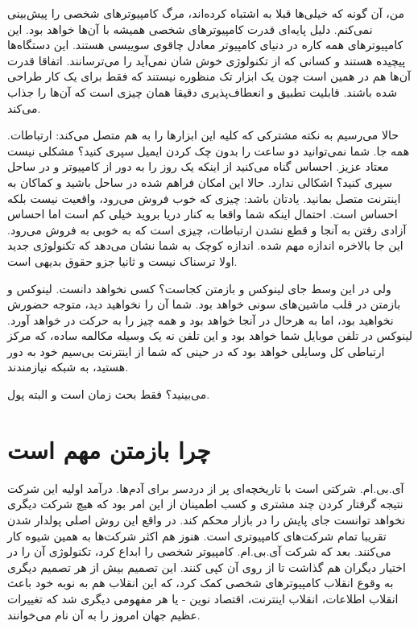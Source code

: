 من، آن گونه که خیلی‌ها قبلا به اشتباه کرده‌اند، مرگ کامپیوترهای شخصی را
پیش‌بینی نمی‌کنم. دلیل پایه‌ای قدرت کامپیوترهای شخصی همیشه با آن‌ها خواهد
بود. این کامپیوترهای همه کاره در دنیای کامپیوتر معادل چاقوی سوییسی
هستند. این دستگاه‌ها پیچیده هستند و کسانی که از تکنولوژی خوش شان نمی‌آید
را می‌ترسانند. اتفاقا قدرت آن‌ها هم در همین است چون یک ابزار تک منظوره
نیستند که فقط برای یک کار طراحی شده باشند. قابلیت تطبیق و انعطاف‌پذیری
دقیقا همان‌ چیزی است که آن‌ها را جذاب می‌کند.

حالا می‌رسیم به نکته‌ مشترکی که کلیه این ابزارها را به هم متصل می‌کند:
ارتباطات. همه جا. شما نمی‌توانید دو ساعت را بدون چک کردن ایمیل سپری
کنید؟ مشکلی نیست معتاد عزیز. احساس گناه می‌کنید از اینکه یک روز را به
دور از کامپیوتر و در ساحل سپری کنید؟ اشکالی ندارد. حالا این امکان
فراهم شده در ساحل باشید و کماکان به اینترنت متصل بمانید. یادتان باشد:
چیزی که خوب فروش می‌رود، واقعیت نیست بلکه احساس است. احتمال اینکه شما
واقعا به کنار دریا بروید خیلی کم است اما احساس آزادی رفتن به آنجا و
قطع نشدن ارتباطات، چیزی است که به خوبی به فروش می‌رود. این جا بالاخره
اندازه مهم شده. اندازه کوچک به شما نشان می‌دهد که تکنولوژی جدید اولا
ترسناک نیست و ثانیا جزو حقوق بدیهی است.

ولی در این وسط جای لینوکس و بازمتن کجاست؟ کسی نخواهد دانست. لینوکس و
بازمتن در قلب ماشین‌های سونی خواهد بود. شما آن را نخواهید دید، متوجه
حضورش نخواهید بود، اما به هرحال در آنجا خواهد بود و همه چیز را به حرکت
در خواهد آورد. لینوکس در تلفن موبایل شما خواهد بود و این تلفن نه یک
وسیله مکالمه ساده، که مرکز ارتباطی کل وسایلی خواهد بود که در حینی که
شما از اینترنت بی‌سیم خود به دور هستید، به شبکه نیازمندند.

می‌بینید؟ فقط بحث زمان است و البته پول. 

\section{چرا بازمتن مهم است}
آی.بی.ام. شرکتی است با تاریخچه‌ای پر از دردسر برای آدم‌ها. درآمد اولیه
این شرکت نتیجه گرفتار کردن چند مشتری و کسب اطمینان از این امر بود که
هیچ شرکت دیگری نخواهد توانست جای پایش را در بازار محکم کند. در واقع
این روش اصلی پولدار شدن تقریبا تمام شرکت‌های کامپیوتری است. هنوز هم
اکثر شرکت‌ها به همین شیوه کار می‌کنند. بعد که شرکت آی.بی.ام. کامپیوتر
شخصی را ابداع کرد، تکنولوژی آن را در اختیار دیگران هم گذاشت تا از روی
آن کپی کنند. این تصمیم بیش از هر تصمیم دیگری به وقوع انقلاب
کامپیوترهای شخصی کمک کرد، که این انقلاب هم به نوبه خود باعث انقلاب
اطلاعات، انقلاب اینترنت، اقتصاد نوین - یا هر مفهومی دیگری شد که
تغییرات عظیم جهان امروز را به آن نام می‌خوانند.

